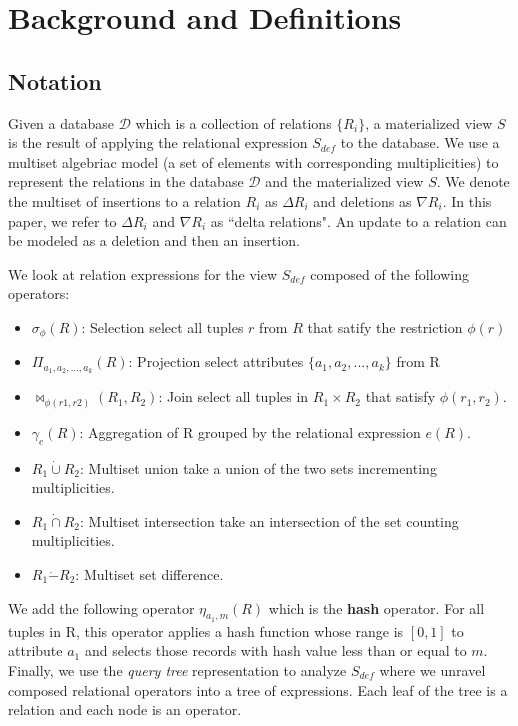 \section{Background and Definitions}\label{sec-background}
\vspace{-.5em}
\subsection{Notation}
Given a database $\mathcal{D}$ which is a collection of relations $\{R_i\}$, a materialized view $S$ is the result of applying the relational expression $S_{def}$ to the database.
We use a multiset algebriac model (a set of elements with corresponding multiplicities) to represent the relations in the database $\mathcal{D}$ and the materialized view $S$.
We denote the multiset of insertions to a relation $R_i$ as $\Delta R_i$ and deletions as $\nabla R_i$.
In this paper, we refer to $\Delta R_i$ and $\nabla R_i$ as ``delta relations".
An update to a relation can be modeled as a deletion and then an insertion.

We look at relation expressions for the view $S_{def}$ composed of the following operators:
\begin{itemize}\vspace{-.45em}
\item $\sigma_{\phi}(R)$: Selection select all tuples $r$ from $R$ that satify the restriction $\phi (r)$ \vspace{-.45em}
\item $\Pi_{a_1,a_2,...,a_k}(R)$: Projection select attributes $\{a_1,a_2,...,a_k\}$ from R \vspace{-.45em}
\item $\bowtie_{\phi (r1,r2)}(R_1,R_2)$: Join select all tuples in $R_1 \times R_2$ that satisfy $\phi (r_1,r_2)$.
\item $\gamma_{e}(R)$: Aggregation of R grouped by the relational expression $e(R)$.\vspace{-.45em}
\item $R_1 \dot{\cup} R_2$: Multiset union take a union of the two sets incrementing multiplicities.
\item $R_1 \dot{\cap} R_2$: Multiset intersection take an intersection of the set counting multiplicities.
\item $R_1 \dot{-} R_2$: Multiset set difference.
\end{itemize}
We add the following operator $\eta_{a_1, m}(R)$ which is the \textbf{hash} operator.
For all tuples in R, this operator applies a hash function whose range is $[0,1]$ to attribute $a_1$ and selects those records with hash value less than or equal to $m$.
Finally, we use the \emph{query tree} representation to analyze $S_{def}$ where we unravel composed relational operators into a tree of expressions.
Each leaf of the tree is a relation and each node is an operator.

